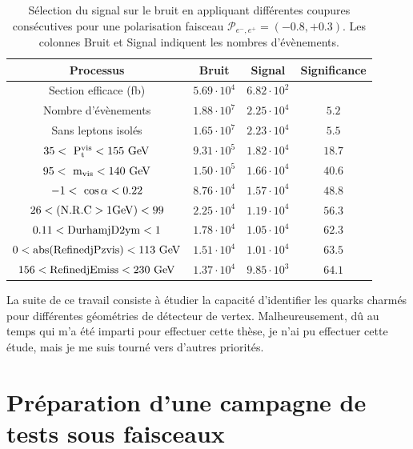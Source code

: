     \begin{table}
    \begin{tabular}{c c c c}
      \hline
      Processus                                     & Bruit        & Signal              & Significance  \tabularnewline
      \hline
      \hline
      Section efficace (fb)                          & $5.69 \cdot 10^{4}$ & $6.82 \cdot 10^{2}$ &               \tabularnewline
      Nombre d'évènements                       & $1.88 \cdot 10^{7}$ & $2.25 \cdot 10^{4}$ & $5.2$         \tabularnewline
      Sans leptons isolés                         & $1.65 \cdot 10^{7}$ & $2.23 \cdot 10^{4}$ & $5.5$         \tabularnewline
      {$35 <~\rm{{P}_{t}^{vis}} < 155~\rm{GeV} $} & $9.31 \cdot 10^{5}$ & $1.82 \cdot 10^{4}$ & $18.7$        \tabularnewline
      {$95 <~\rm{m_{vis}}< 140~\rm{GeV}$}         & $1.50 \cdot 10^{5}$ & $1.66 \cdot 10^{4}$ & $40.6$        \tabularnewline
      {$-1 <~\rm{\cos{\alpha}}< 0.22$}            & $8.76 \cdot 10^{4}$ & $1.57 \cdot 10^{4}$ & $48.8$        \tabularnewline
      $26 < (\rm{N.R.C > 1GeV}) < 99$                    & $2.25 \cdot 10^{4}$ & $1.19 \cdot 10^{4}$ & $56.3$        \tabularnewline
      $0.11 < \rm{DurhamjD2ym} < 1$               & $1.78 \cdot 10^{4}$ & $1.05 \cdot 10^{4}$ & $62.3$        \tabularnewline
      $0 < \rm{abs(RefinedjPzvis)} < 113~\rm{GeV}$& $1.51 \cdot 10^{4}$ & $1.01 \cdot 10^{4}$ & $63.5$        \tabularnewline
      $156 < \rm{RefinedjEmiss} < 230~\rm{GeV}$   & $1.37 \cdot 10^{4}$ & $9.85 \cdot 10^{3}$ & $64.1$        \tabularnewline      
    \end{tabular}
    \caption{Sélection du signal sur le bruit en appliquant différentes coupures consécutives pour une polarisation faisceau $\mathcal{P}_{e^{-},e^{+}} = (-0.8, +0.3)$. 
    Les colonnes \og{}Bruit\fg{} et \og{}Signal\fg{} indiquent les nombres d'évènements.}
    \label{tab:cutFlow_resume}
  \end{table}

  La suite de ce travail consiste à étudier la capacité d'identifier les quarks charmés pour différentes géométries de détecteur de vertex. 
  Malheureusement, dû au temps qui m'a été imparti pour effectuer cette thèse, je n'ai pu effectuer cette étude, mais je me suis tourné vers d'autres priorités.

  \section{Préparation d'une campagne de tests sous faisceaux}

